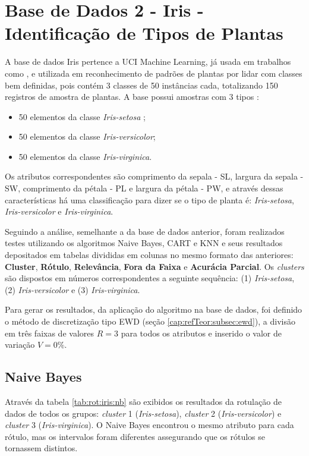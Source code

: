 \section{Base de Dados 2 - Iris - Identificação de Tipos de Plantas}

A base de dados Iris pertence a UCI Machine Learning, já usada em trabalhos como , e utilizada em reconhecimento de padrões de plantas por lidar com classes bem definidas, pois contém 3 classes de 50 instâncias cada, totalizando 150 registros de amostra de plantas. A base possui amostras com 3 tipos \cite{FISHER1936}:

\begin{itemize}[noitemsep]
 \item 50 elementos da classe \textit{Iris-setosa} ;
 \item 50 elementos da classe \textit{Iris-versicolor};
 \item 50 elementos da classe \textit{Iris-virginica}.
\end{itemize}

Os atributos correspondentes são comprimento da sepala - SL, largura da sepala - SW, comprimento da pétala - PL e largura da pétala - PW, e através dessas características há uma classificação para dizer se o tipo de planta é: \textit{Iris-setosa}, \textit{Iris-versicolor} e \textit{Iris-virginica}.

Seguindo a análise, semelhante a da base de dados anterior, foram realizados testes utilizando os algoritmos Naive Bayes, CART e KNN e seus resultados depositados em tabelas divididas em colunas no mesmo formato das anteriores: \textbf{Cluster}, \textbf{Rótulo}, \textbf{Relevância}, \textbf{Fora da Faixa} e \textbf{Acurácia Parcial}. Os \textit{clusters} são dispostos em números correspondentes a seguinte sequência: (1) \textit{Iris-setosa}, (2) \textit{Iris-versicolor} e (3) \textit{Iris-virginica}.
 

Para gerar os resultados, da aplicação do algoritmo na base de dados, foi definido o método de discretização tipo EWD (seção \ref{cap:refTeor:subsec:ewd}), a divisão em três faixas de valores ${R = 3}$ para todos os atributos e inserido o valor de variação ${V=0\%}$. 

\subsection{Naive Bayes} \label{cap:resultados:ssec:iris:nb}

Através da tabela \ref{tab:rot:iris:nb}  são exibidos os resultados da rotulação de dados de todos os grupos: \textit{cluster} 1 (\textit{Iris-setosa}), \textit{cluster} 2 (\textit{Iris-versicolor}) e \textit{cluster} 3 (\textit{Iris-virginica}). O Naive Bayes encontrou o mesmo atributo para cada rótulo, mas os intervalos foram diferentes assegurando que os rótulos se tornassem distintos.
 
